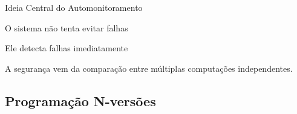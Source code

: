 \documentclass[9pt]{beamer}
\begin{document}
\begin{frame}{Ideia Central do Automonitoramento}
\centering

\Large
O sistema não tenta evitar falhas

\vspace{0.4cm}

\Large
Ele detecta falhas imediatamente

\vspace{0.8cm}

\small
A segurança vem da comparação entre múltiplas computações independentes.

\end{frame}
\subsection{Programação N-versões}
\end{document}
